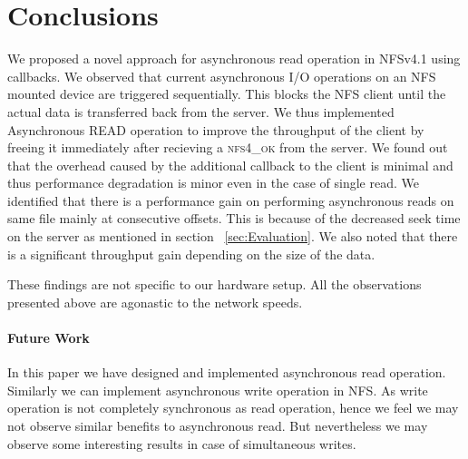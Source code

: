 \section{Conclusions}
\label{conc}
We proposed a novel approach for asynchronous read operation in NFSv4.1 using callbacks. We observed that current asynchronous I/O operations on an NFS mounted device are triggered sequentially. This blocks the NFS client until the actual data is transferred back from the server. We thus implemented Asynchronous READ operation to improve the throughput of the client by freeing it immediately after recieving a \textsc{nfs4\_ok} from the server. We found out that the overhead caused by the additional callback to the client is minimal and thus performance degradation is minor even in the case of single read. We identified that there is a performance gain on performing asynchronous reads on same file mainly at consecutive offsets. This is because of the decreased seek time on the server as mentioned in section ~\ref{sec:Evaluation}. We also noted that there is a significant throughput gain depending on the size of the data.  

These findings are not specific to our hardware setup. All the observations presented above are agonastic to the network speeds.  

\paragraph{Future Work}

In this paper we have designed and implemented asynchronous read operation. Similarly we can implement asynchronous write operation in NFS. As write operation is not completely synchronous as read operation, hence we feel we may not observe similar benefits to asynchronous read. But nevertheless we may observe some interesting results in case of simultaneous writes.   


